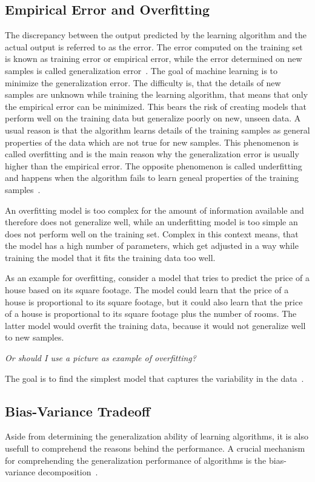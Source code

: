 \subsection{Empirical Error and Overfitting}\label{subsec:overfitting-and-underfitting}
The discrepancy between the output predicted by the learning algorithm and the actual output is referred to as the
error.
The error computed on the training set is known as training error or empirical error, while the error determined on new
samples is called generalization error~\cite[p. 26]{zhou_machinelearning_2021}.
The goal of machine learning is to minimize the generalization error.
The difficulty is, that the details of new samples are unknown while training the learning algorithm, that means that
only the empirical error can be minimized.
This bears the risk of creating models that perform well on the training data but
generalize poorly on new, unseen data.
A usual reason is that the algorithm learns details of the training samples as general properties of the data
which are not true for new samples.
This phenomenon is called overfitting and is the main reason why the generalization error is usually higher than the
empirical error.
The opposite phenomenon is called underfitting and happens when the algorithm fails to learn geneal properties of
the training samples~\cite[p. 26]{zhou_machinelearning_2021}.

An overfitting model is too complex for the amount of information available and therefore does not generalize well,
while an underfitting model is too simple an does not perform well on the training set.
Complex in this context means, that the model has a high number of parameters, which get adjusted in a way while
training the model that it fits the training data too well.

As an example for overfitting, consider a model that tries to predict the price of a house based on its square footage.
The model could learn that the price of a house is proportional to its square footage, but it could also learn that the
price of a house is proportional to its square footage plus the number of rooms.
The latter model would overfit the training data, because it would not generalize well to new samples.

\textit{Or should I use a picture as example of overfitting?}

The goal is to find the simplest model that captures the variability in the
data~\cite[p. 35]{muller_introductionmachinelearning_2016}.

\subsection{Bias-Variance Tradeoff}\label{subsec:bias-variance-tradeoff}
Aside from determining the generalization ability of learning algorithms, it is also usefull to comprehend the
reasons behind the performance.
A crucial mechanism for comprehending the generalization performance of algorithms is the bias-variance
decomposition~\cite[pp. 49]{zhou_machinelearning_2021}.

